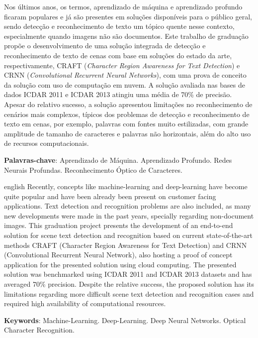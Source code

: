 
\setlength{\absparsep}{18pt} %
\begin{resumo}
Nos últimos anos, os termos, aprendizado de máquina e aprendizado profundo ficaram populares e já são 
presentes em soluções disponíveis para o público geral, sendo detecção e reconhecimento de texto um tópico 
quente nesse contexto, especialmente quando imagens não são documentos.
Este trabalho de graduação propõe o desenvolvimento de uma solução integrada de detecção e reconhecimento 
de texto de cenas com base em soluções do estado da arte, respectivamente, CRAFT (\textit{Character Region Awareness for Text Detection}) 
e CRNN (\textit{Convolutional Recurrent Neural Networks}), com uma prova de conceito da solução com uso de computação em nuvem.
A solução avaliada nas bases de dados ICDAR 2011 e ICDAR 2013 atingiu uma média de 70\% de precisão. 
Apesar do relativo sucesso, a solução apresentou limitações no reconhecimento de cenários mais complexos, típicos 
dos problemas de detecção e reconhecimento de texto em cenas, por exemplo, palavras com fontes muito estilizadas, 
com grande amplitude de tamanho de caracteres e palavras não horizontais, além do alto uso de recursos computacionais.

 \textbf{Palavras-chave}: Aprendizado de Máquina. Aprendizado Profundo. Redes Neurais Profundas. Reconhecimento Óptico de Caracteres.
\end{resumo}

\begin{resumo}[Abstract]
 \begin{otherlanguage*}{english}
   Recently, concepts like machine-learning and deep-learning have become quite popular and have been already been 
   present on customer facing applications. Text detection and recognition problems are also included, as many new 
   developments were made in the past years, specially regarding non-document images.
   This graduation project presents the development of an end-to-end solution for scene text detection and recognition 
   based on current state-of-the-art methods CRAFT (Character Region Awareness for Text Detection) and CRNN 
   (Convolutional Recurrent Neural Network), also hosting a proof of concept application for the presented solution using cloud computing. 
   The presented solution was benchmarked using ICDAR 2011 and ICDAR 2013 datasets and has averaged 70\% precision. Despite the 
   relative success, the proposed solution has its limitations regarding more difficult scene text detection and recognition 
   cases and required high availability of computational resources.

   \vspace{\onelineskip}
 
   \noindent 
   \textbf{Keywords}: Machine-Learning. Deep-Learning. Deep Neural Networks. Optical Character Recognition.
 \end{otherlanguage*}
\end{resumo}